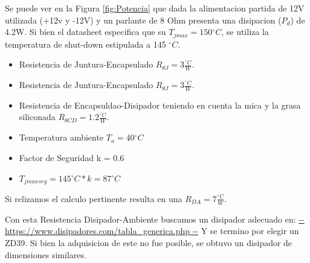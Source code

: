 Se puede ver en la Figura \ref{fig:Potencia} que dada la alimentacion partida de 12V utilizada (+12v y -12V) y un parlante de 8 Ohm presenta una disipacion ($P_{d}$) de 4.2W.
Si bien el datasheet especifica que su $T_{jmax} = 150 {^\circ C}$, se utiliza la temperatura de shut-down estipulada a 145 ${^\circ C}$.

\begin{itemize}
  \item Resistencia de Juntura-Encapsulado $R_{\theta J} = 3 \frac{^\circ C}{W}$.
  \item Resistencia de Juntura-Encapsulado $R_{\theta J} = 3 \frac{^\circ C}{W}$.
  \item Resistencia de Encapsuldao-Disipador teniendo en cuenta la mica y la grasa siliconada $R_{\theta CD} = 1.2 \frac{^\circ C}{W}$.
  \item Temperatura ambiente $T_{a} = 40 {^\circ C}$
  \item Factor de Seguridad k = 0.6
  \item $T_{jmaxseg} = 145 {^\circ C} * k = 87 {^\circ C}$
\end{itemize} 

Si relizamos el calculo pertinente resulta en una $R_{DA} = 7 \frac{^\circ C}{W}$.

Con esta Resistencia Disipador-Ambiente buscamos un disipador adecuado en:
\url{-- https://www.disipadores.com/tabla_generica.php --}
Y se termino por elegir un ZD39. Si bien la adquisicion de este no fue posible, se obtuvo un disipador de dimensiones similares.
